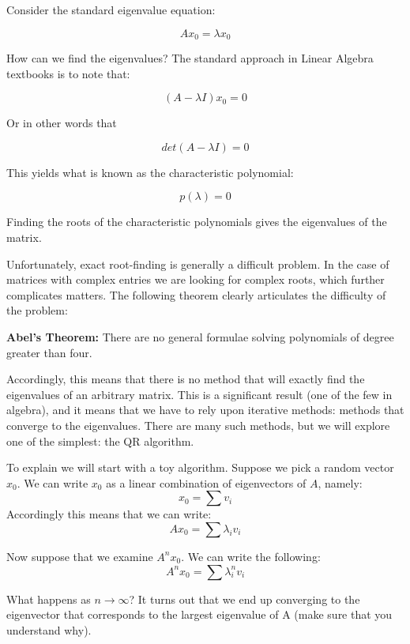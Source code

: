

Consider the standard eigenvalue equation:

\[
A x_0 = \lambda x_0
\]

How can we find the eigenvalues? The standard approach in Linear Algebra textbooks is to note that:

\[
(A-\lambda I)x_0 = 0
\]

Or in other words that

\[
det(A-\lambda I) = 0
\]

This yields what is known as the characteristic polynomial:

\[
p(\lambda) = 0
\]

Finding the roots of the characteristic polynomials gives the eigenvalues of the matrix.

Unfortunately, exact root-finding is generally a difficult problem. In the case of matrices with complex entries we are looking for complex roots, which further complicates matters. The following theorem clearly articulates the difficulty of the problem:

\begin{theorem}
{\bf Abel's Theorem:} There are no general formulae solving polynomials of degree greater than four.
\end{theorem}

Accordingly, this means that there is no method that will exactly find the eigenvalues of an arbitrary matrix. This is a significant result (one of the few in algebra), and it means that we have to rely upon iterative methods: methods that converge to the eigenvalues. There are many such methods, but we will explore one of the simplest: the QR algorithm.

To explain we will start with a toy algorithm. Suppose we pick a random vector $x_0$. We can write $x_0$ as a linear combination of eigenvectors of $A$, namely:
\[
x_0 = \sum v_i
\]
Accordingly this means that we can write:
\[
Ax_0 = \sum \lambda_i v_i
\]

Now suppose that we examine $A^n x_0$. We can write the following:
\[
A^n x_0 = \sum \lambda_i^n v_i
\]

What happens as $n \rightarrow \infty$? It turns out that we end up converging to the eigenvector that corresponds to the largest eigenvalue of A (make sure that you understand why).  %

